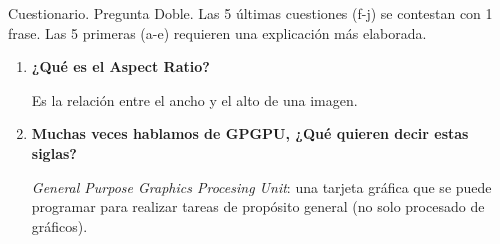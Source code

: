 \begin{pregunta}{Cuestionario. Pregunta Doble. Las 5 últimas cuestiones (f-j) se contestan con 1 frase. Las 5
primeras (a-e) requieren una explicación más elaborada.}
\begin{enumerate}[label=\textbf{(\alph*)}]
\item \textbf{¿Qué es el Aspect Ratio?}

        Es la relación entre el ancho y el alto de una imagen.

\item \textbf{Muchas veces hablamos de GPGPU, ¿Qué quieren decir estas siglas?}

        \emph{General Purpose Graphics Procesing Unit}: una tarjeta gráfica que
        se puede programar para realizar tareas de propósito general (no solo
        procesado de gráficos).

\end{enumerate}

\end{pregunta}
